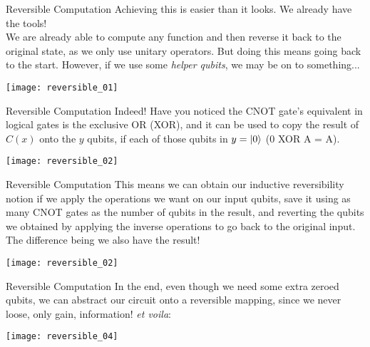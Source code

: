 \documentclass[aspectratio=43]{beamer}
\begin{document}
\begin{frame}{\q Reversible Computation}
    Achieving this is easier than it looks. We already have the tools!\\
    We are already able to compute any function and then reverse it back to the original state, as we only use unitary operators. But doing this means going back to the start. However, if we use some \textit{helper qubits}, we may be on to something...
    \begin{center}
        \texttt{[image: reversible\_01]}
    \end{center}
\pagenumber
\end{frame}

\begin{frame}{\q Reversible Computation}
    Indeed! Have you noticed the CNOT gate's equivalent in logical gates is the exclusive OR (XOR), and it can be used to copy the result of $C(x)$ onto the $y$ qubits, if each of those qubits in $y=\ket{0}$ (0 XOR A = A).
    \begin{center}
        \texttt{[image: reversible\_02]}
    \end{center}
\pagenumber
\end{frame}


\begin{frame}{\q Reversible Computation}
    This means we can obtain our inductive reversibility notion if we apply the operations we want on our input qubits, save it using as many CNOT gates as the number of qubits in the result, and reverting the qubits we obtained by applying the inverse operations to go back to the original input. The difference being we also have the result!
    \begin{center}
        \texttt{[image: reversible\_02]}
    \end{center}
\pagenumber
\end{frame}

\begin{frame}{\q Reversible Computation}
    In the end, even though we need some extra zeroed qubits, we can abstract our circuit onto a reversible mapping, since we never loose, only gain, information! \textit{et voila}:
    \begin{center}
        \texttt{[image: reversible\_04]}
    \end{center}
\pagenumber
\end{frame}
\end{document}
